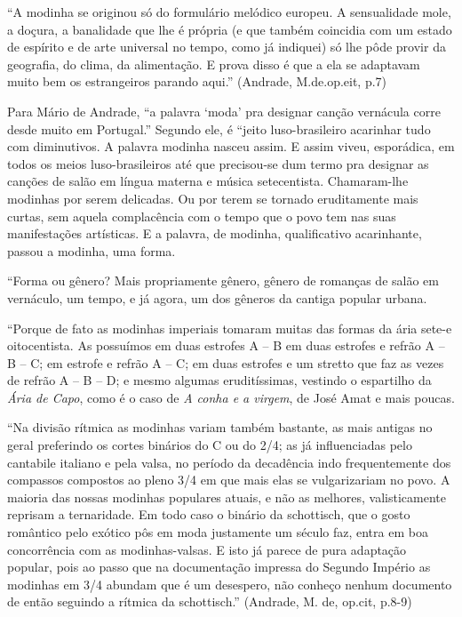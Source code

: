 ``A modinha se originou só do formulário melódico europeu. A sensualidade
mole, a doçura, a banalidade que lhe é própria (e que também coincidia
com um estado de espírito e de arte universal no tempo, como já
indiquei) só lhe pôde provir da geografia, do clima, da alimentação. E
prova disso é que a ela se adaptavam muito bem os estrangeiros parando
aqui.'' (Andrade, M.de.op.eit, p.7)

Para Mário de Andrade, ``a palavra `moda' pra designar canção vernácula
corre desde muito em Portugal.'' Segundo ele, é ``jeito luso-brasileiro
acarinhar tudo com diminutivos. A palavra modinha nasceu assim. E assim
viveu, esporádica, em todos os meios luso-brasileiros até que
precisou-se dum termo pra designar as canções de salão em língua materna
e música setecentista. Chamaram-lhe modinhas por serem delicadas. Ou por
terem se tornado eruditamente mais curtas, sem aquela complacência com o
tempo que o povo tem nas suas manifestações artísticas. E a palavra, de
modinha, qualificativo acarinhante, passou a modinha, uma forma.

``Forma ou gênero? Mais propriamente gênero, gênero de romanças de salão
em vernáculo, um tempo, e já agora, um dos gêneros da cantiga popular
urbana.

``Porque de fato as modinhas imperiais tomaram muitas das formas da ária
sete-e oitocentista. As possuímos em duas estrofes A -- B em duas
estrofes e refrão A -- B -- C; em estrofe e refrão A -- C; em duas estrofes
e um stretto que faz as vezes de refrão A -- B -- D; e mesmo algumas
eruditíssimas, vestindo o espartilho da \emph{Ária de Capo}, como é o
caso de \emph{A conha e a virgem}, de José Amat e mais poucas.

``Na divisão rítmica as modinhas variam também bastante, as mais antigas
no geral preferindo os cortes binários do C ou do 2/4; as já
influenciadas pelo cantabile italiano e pela valsa, no período da
decadência indo frequentemente dos compassos compostos ao pleno 3/4 em
que mais elas se vulgarizariam no povo. A maioria das nossas modinhas
populares atuais, e não as melhores, valisticamente reprisam a
ternaridade. Em todo caso o binário da schottisch, que o gosto romântico
pelo exótico pôs em moda justamente um século faz, entra em boa
concorrência com as modinhas-valsas. E isto já parece de pura adaptação
popular, pois ao passo que na documentação impressa do Segundo Império
as modinhas em 3/4 abundam que é um desespero, não conheço nenhum
documento de então seguindo a rítmica da schottisch.'' (Andrade, M. de,
op.cit, p.8-9)

